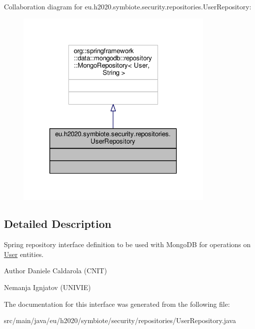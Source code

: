 Collaboration diagram for eu.\+h2020.\+symbiote.\+security.\+repositories.\+User\+Repository\+:
\nopagebreak
\begin{figure}[H]
\begin{center}
\leavevmode
\includegraphics[width=273pt]{interfaceeu_1_1h2020_1_1symbiote_1_1security_1_1repositories_1_1UserRepository__coll__graph}
\end{center}
\end{figure}


\subsection{Detailed Description}
Spring repository interface definition to be used with Mongo\+DB for operations on \hyperlink{}{User} entities.

\begin{DoxyAuthor}{Author}
Daniele Caldarola (C\+N\+IT) 

Nemanja Ignjatov (U\+N\+I\+V\+IE) 
\end{DoxyAuthor}


The documentation for this interface was generated from the following file\+:\begin{DoxyCompactItemize}
\item 
src/main/java/eu/h2020/symbiote/security/repositories/User\+Repository.\+java\end{DoxyCompactItemize}

